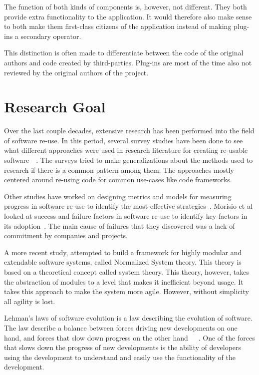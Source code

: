 \noindent The function of both kinds of components is, however, not different. They both provide extra functionality to the application. It would therefore also make sense to both make them first-class citizens of the application instead of making plug-ins a secondary operator.

This distinction is often made to differentiate between the code of the original authors and code created by third-parties. Plug-ins are most of the time also not reviewed by the original authors of the project.

\section{Research Goal}

Over the last couple decades, extensive research has been performed into the field of software re-use. In this period, several survey studies have been done to see what different approaches were used in research literature for creating re-usable software~\cite{krueger1992software}~\cite{frakes2005software}. The surveys tried to make generalizations about the methods used to research if there is a common pattern among them. The approaches mostly centered around re-using code for common use-cases like code frameworks. 

Other studies have worked on designing metrics and models for measuring progress in software re-use to identify the most effective strategies~\cite{frakes1996software}. Morisio et al looked at success and failure factors in software re-use to identify key factors in its adoption~\cite{morisio2002success}. The main cause of failures that they discovered was a lack of commitment by companies and projects.

A more recent study, attempted to build a framework for highly modular and extendable software systems, called Normalized System theory. This theory is based on a theoretical concept called system theory. This theory, however, takes the abstraction of modules to a level that makes it inefficient beyond usage. It takes this approach to make the system more agile. However, without simplicity all agility is lost. ~\cite{de2018enabling}


Lehman's laws of software evolution is a law describing the evolution of software. The law describe a balance between forces driving new developments on one hand, and forces that slow down progress on the other hand~\cite{lehman1980programs}~\cite{lehman1997metrics}~\cite{herraiz2013evolution}. One of the forces that slows down the progress of new developments is the ability of developers using the development to understand and easily use the functionality of the development.

